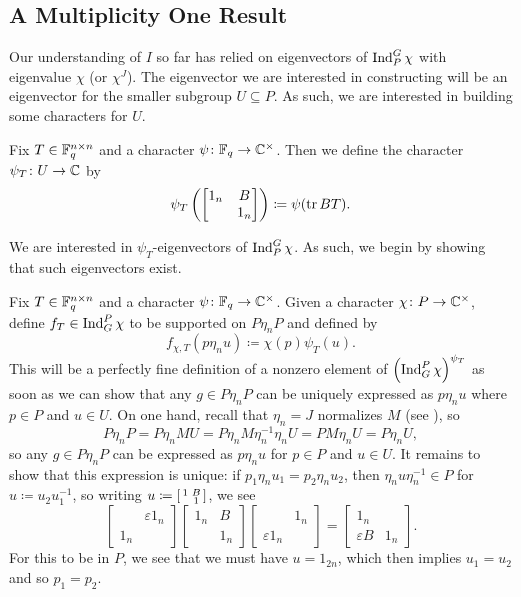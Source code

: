 
\subsection{A Multiplicity One Result}
Our understanding of $I$ so far has relied on eigenvectors of $\operatorname{Ind}_P^G\chi$ with eigenvalue $\chi$ (or $\chi^J$). The eigenvector we are interested in constructing will be an eigenvector for the smaller subgroup $U\subseteq P$. As such, we are interested in building some characters for $U$.
\begin{definition}
	Fix $T\in \mathbb F_q^{n\times n}$ and a character $\psi\colon\mathbb F_q\to\mathbb C^\times$. Then we define the character $\psi_T\colon U\to\mathbb C$ by
	\[\psi_T\left(\begin{bmatrix}
		1_n & B \\ & 1_n
	\end{bmatrix}\right)\coloneqq\psi(\operatorname{tr} BT).\]
\end{definition}
We are interested in $\psi_T$-eigenvectors of $\operatorname{Ind}_P^G\chi$. As such, we begin by showing that such eigenvectors exist.
\begin{example} \label{ex:produce-psi-t-eigen}
	Fix $T\in \mathbb F_q^{n\times n}$ and a character $\psi\colon\mathbb F_q\to\mathbb C^\times$. Given a character $\chi\colon P\to\mathbb C^\times$, define $f_T\in\operatorname{Ind}_G^P\chi$ to be supported on $P\eta_nP$ and defined by
	\[f_{\chi,T}(p\eta_nu)\coloneqq\chi(p)\psi_T(u).\]
	This will be a perfectly fine definition of a nonzero element of $\left(\operatorname{Ind}_G^P\chi\right)^{\psi_T}$ as soon as we can show that any $g\in P\eta_nP$ can be uniquely expressed as $p\eta_nu$ where $p\in P$ and $u\in U$. On one hand, recall that $\eta_n=J$ normalizes $M$ (see ), so
	\[P\eta_nP=P\eta_nMU=P\eta_nM\eta_n^{-1}\eta_nU=PM\eta_nU=P\eta_nU,\]
	so any $g\in P\eta_nP$ can be expressed as $p\eta_nu$ for $p\in P$ and $u\in U$. It remains to show that this expression is unique: if $p_1\eta_nu_1=p_2\eta_nu_2$, then $\eta_nu\eta_n^{-1}\in P$ for $u\coloneqq u_2u_1^{-1}$, so writing $u\coloneqq\begin{bsmallmatrix}
		1 & B \\ & 1
	\end{bsmallmatrix}$, we see
	\[\begin{bmatrix}
		& \varepsilon1_n \\ 1_n
	\end{bmatrix}\begin{bmatrix}
		1_n & B \\ & 1_n
	\end{bmatrix}\begin{bmatrix}
		& 1_n \\ \varepsilon1_n
	\end{bmatrix}=\begin{bmatrix}
		1_n \\ \varepsilon B & 1_n
	\end{bmatrix}.\]
	For this to be in $P$, we see that we must have $u=1_{2n}$, which then implies $u_1=u_2$ and so $p_1=p_2$.
\end{example}

